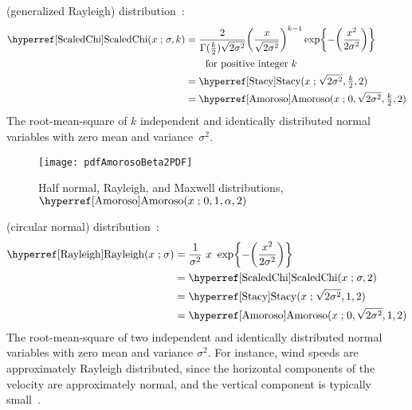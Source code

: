  (generalized Rayleigh) distribution~\cite{Miller1964,Johnson1994}:
\begin{align}
\opr{ScaledChi}(x \given \sigma, k) 
&= \frac{2}{\Gamma(\tfrac{k}{2}) \sqrt{2\sigma^2}} { \Left(\frac{x}{\sqrt{2\sigma^2}}\Right)}^{k-1} 
\exp\Left\{-\Left(\frac{x^2}{2\sigma^2}\Right)\Right\} 
\notag \checked
\\
& \qquad \text{for positive integer } k \notag \checked \\
&=  \opr{Stacy}(x\given \sqrt{2\sigma^2}, \tfrac{k}{2},2)  \checked
\label{ScaledChi}
\\
&=  \opr{Amoroso}(x \given 0, \sqrt{2\sigma^2}, \tfrac{k}{2}, 2) \checked
\notag 
\end{align}
The root-mean-square of $k$ independent and identically distributed normal variables with zero mean and variance~$\sigma^2$. 


\begin{figure}[t]
\begin{center}
\texttt{[image: pdfAmorosoBeta2PDF]}
\end{center}
\caption[Half normal, Rayleigh and Maxwell distributions]{Half normal, Rayleigh, and Maxwell distributions, $\opr{Amoroso}(x\given 0,1,\alpha,2)$}
\end{figure}



 (circular normal) distribution~\cite{Strutt1880,Johnson1994}:
%
\begin{align}
\label{Rayleigh}
\opr{Rayleigh}(x \given \sigma) 
&= \frac{1}{\sigma^2 }\ x\  \exp\Left\{-\Left(\frac{x^2}{2 \sigma^2}\Right)\Right\}  \checked
\\
&=\opr{ScaledChi}(x \given \sigma, 2) \notag 							\checked \\
&=  \opr{Stacy}(x\given  \sqrt{2\sigma^2} ,1,2) \notag					\checked \\
&=  \opr{Amoroso}(x\given  0, \sqrt{2\sigma^2} , 1, 2) 					\checked \notag 
\end{align}
 The root-mean-square of two independent and identically distributed normal variables with zero mean and variance $\sigma^2$. 
 For instance, wind speeds are approximately Rayleigh distributed, since the horizontal components of the velocity are approximately normal, and the vertical component is typically small~\cite{Justus1978}. 


